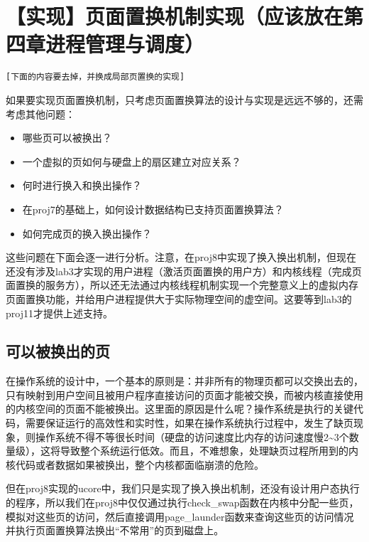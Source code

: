 \section{【实现】页面置换机制实现（应该放在第四章进程管理与调度）}\label{ux5b9eux73b0ux9875ux9762ux7f6eux6362ux673aux5236ux5b9eux73b0ux5e94ux8be5ux653eux5728ux7b2cux56dbux7ae0ux8fdbux7a0bux7ba1ux7406ux4e0eux8c03ux5ea6}

\lstinline![下面的内容要去掉，并换成局部页置换的实现]!

如果要实现页面置换机制，只考虑页面置换算法的设计与实现是远远不够的，还需考虑其他问题：

\begin{itemize}
\tightlist
\item
  哪些页可以被换出？
\item
  一个虚拟的页如何与硬盘上的扇区建立对应关系？
\item
  何时进行换入和换出操作？
\item
  在proj7的基础上，如何设计数据结构已支持页面置换算法？
\item
  如何完成页的换入换出操作？
\end{itemize}

这些问题在下面会逐一进行分析。注意，在proj8中实现了换入换出机制，但现在还没有涉及lab3才实现的用户进程（激活页面置换的用户方）和内核线程（完成页面置换的服务方），所以还无法通过内核线程机制实现一个完整意义上的虚拟内存页面置换功能，并给用户进程提供大于实际物理空间的虚空间。这要等到lab3的proj11才提供上述支持。

\subsection{可以被换出的页}\label{ux53efux4ee5ux88abux6362ux51faux7684ux9875}

在操作系统的设计中，一个基本的原则是：并非所有的物理页都可以交换出去的，只有映射到用户空间且被用户程序直接访问的页面才能被交换，而被内核直接使用的内核空间的页面不能被换出。这里面的原因是什么呢？操作系统是执行的关键代码，需要保证运行的高效性和实时性，如果在操作系统执行过程中，发生了缺页现象，则操作系统不得不等很长时间（硬盘的访问速度比内存的访问速度慢2\textasciitilde{}3个数量级），这将导致整个系统运行低效。而且，不难想象，处理缺页过程所用到的内核代码或者数据如果被换出，整个内核都面临崩溃的危险。

但在proj8实现的ucore中，我们只是实现了换入换出机制，还没有设计用户态执行的程序，所以我们在proj8中仅仅通过执行check\_swap函数在内核中分配一些页，模拟对这些页的访问，然后直接调用page\_launder函数来查询这些页的访问情况并执行页面置换算法换出``不常用''的页到磁盘上。


